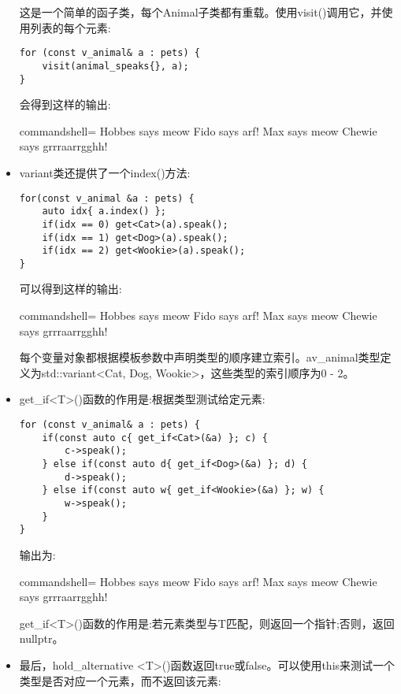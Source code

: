 \begin{itemize}
这是一个简单的函子类，每个Animal子类都有重载。使用visit()调用它，并使用列表的每个元素:

\begin{lstlisting}[style=styleCXX]
for (const v_animal& a : pets) {
	visit(animal_speaks{}, a);
}
\end{lstlisting}

会得到这样的输出:

\begin{tcblisting}{commandshell={}}
Hobbes says meow
Fido says arf!
Max says meow
Chewie says grrraarrgghh!
\end{tcblisting}

\item 
variant类还提供了一个index()方法:

\begin{lstlisting}[style=styleCXX]
for(const v_animal &a : pets) {
	auto idx{ a.index() };
	if(idx == 0) get<Cat>(a).speak();
	if(idx == 1) get<Dog>(a).speak();
	if(idx == 2) get<Wookie>(a).speak();
}
\end{lstlisting}

可以得到这样的输出:

\begin{tcblisting}{commandshell={}}
Hobbes says meow
Fido says arf!
Max says meow
Chewie says grrraarrgghh!
\end{tcblisting}

每个变量对象都根据模板参数中声明类型的顺序建立索引。av\_animal类型定义为std::variant<Cat, Dog, Wookie>，这些类型的索引顺序为0 - 2。

\item 
get\_if<T>()函数的作用是:根据类型测试给定元素:

\begin{lstlisting}[style=styleCXX]
for (const v_animal& a : pets) {
	if(const auto c{ get_if<Cat>(&a) }; c) {
		c->speak();
	} else if(const auto d{ get_if<Dog>(&a) }; d) {
		d->speak();
	} else if(const auto w{ get_if<Wookie>(&a) }; w) {
		w->speak();
	}
}
\end{lstlisting}

输出为:

\begin{tcblisting}{commandshell={}}
Hobbes says meow
Fido says arf!
Max says meow
Chewie says grrraarrgghh!
\end{tcblisting}

get\_if<T>()函数的作用是:若元素类型与T匹配，则返回一个指针;否则，返回nullptr。

\item 
最后，hold\_alternative <T>()函数返回true或false。可以使用this来测试一个类型是否对应一个元素，而不返回该元素:


\end{itemize}
